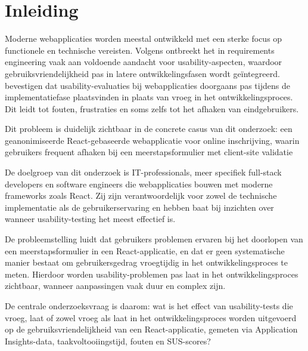 
\section{Inleiding}%
\label{sec:inleiding}
Moderne webapplicaties worden meestal ontwikkeld met een sterke focus op functionele en technische vereisten. 
Volgens \textcite{Fernandez2011} ontbreekt het in requirements engineering vaak aan voldoende aandacht voor usability-aspecten, waardoor gebruiksvriendelijkheid pas in latere ontwikkelingsfasen wordt geïntegreerd. \textcite{Valentim2018} bevestigen dat usability-evaluaties bij webapplicaties doorgaans pas tijdens de implementatiefase plaatsvinden in plaats van vroeg in het ontwikkelingsproces. Dit leidt tot fouten, frustraties en soms zelfs tot het afhaken van eindgebruikers.

Dit probleem is duidelijk zichtbaar in de concrete casus van dit onderzoek: een geanonimiseerde React-gebaseerde webapplicatie voor online inschrijving, waarin gebruikers frequent afhaken bij een meerstapsformulier met client-site validatie

De doelgroep van dit onderzoek is IT-professionals, meer specifiek full-stack developers en software engineers die webapplicaties bouwen met moderne frameworks zoals React. 
Zij zijn verantwoordelijk voor zowel de technische implementatie als de gebruikerservaring en hebben baat bij inzichten over wanneer usability-testing het meest effectief is.

De probleemstelling luidt dat gebruikers problemen ervaren bij het doorlopen van een meerstapsformulier in een React-applicatie, en dat er geen systematische manier bestaat om gebruikersgedrag vroegtijdig in het ontwikkelingsproces te meten. 
Hierdoor worden usability-problemen pas laat in het ontwikkelingsproces zichtbaar, wanneer aanpassingen vaak duur en complex zijn.

De centrale onderzoeksvraag is daarom: wat is het effect van usability-tests die vroeg, laat of zowel vroeg als laat in het ontwikkelingsproces worden uitgevoerd op de gebruiksvriendelijkheid van een React-applicatie, gemeten via Application Insights-data, taakvoltooiingstijd, fouten en SUS-scores?


